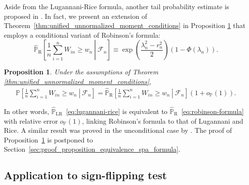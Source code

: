 \documentclass[12pt]{article}
\newtheorem{proposition}{Proposition}
\theoremstyle{definition}
\def\P{\mathbb{P}}
\def\P{\mathbb{P}}
\renewcommand{\P}{\mathbb{P}}							%
\begin{document}
Aside from the Lugannani-Rice formula, another tail probability estimate is proposed in \cite{Robinson1982}. In fact, we present an extension of Theorem~\ref{thm:unified_unnormalized_moment_conditions} in Proposition \ref{prop:equivalence_spa_formula} that employs a conditional variant of Robinson's formula:
  \begin{equation}
	\widehat{\P}_\text{R}\left[\left.\frac{1}{n}\sum_{i = 1}^n W_{in} \geq w_n\ \right|\ \mathcal{F}_n\right] \equiv \exp\left(\frac{\lambda_n^2-r_n^2}{2}\right)(1-\Phi(\lambda_n)).
	\label{eq:robinson-formula}
  \end{equation}
  \begin{proposition}\label{prop:equivalence_spa_formula}
	Under the assumptions of Theorem \ref{thm:unified_unnormalized_moment_conditions},   
	\begin{align}\label{eq:alternative_spa_formula}
	  \P\left[\left.\frac{1}{n}\sum_{i = 1}^n W_{in} \geq w_n\ \right|\ \mathcal{F}_n\right]=\widehat{\P}_\text{R}\left[\left.\frac{1}{n}\sum_{i = 1}^n W_{in} \geq w_n\ \right|\ \mathcal{F}_n\right](1+o_\P(1)).
	  \end{align}
  \end{proposition}
  \noindent In other words, $\widehat{\P}_\text{LR}$~\eqref{eq:lugannani-rice} is equivalent to $\widehat{\P}_\text{R}$~\eqref{eq:robinson-formula} with relative error $o_\P(1)$, linking Robinson's formula to that of Lugannani and Rice. A similar result was proved in the unconditional case by \citet{Kolassa2007}. The proof of Proposition~\ref{prop:equivalence_spa_formula} is postponed to Section~\ref{sec:proof_proposition_equivalence_spa_formula}.



\subsection{Application to sign-flipping test}\label{sec:sign-flipping}
\end{document}
